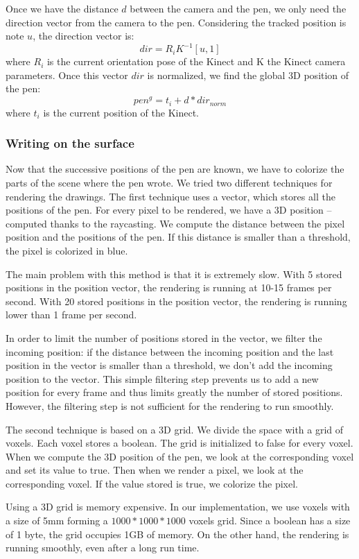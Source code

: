 \documentclass[12pt, twoside]{article}
\begin{document}
Once we have the distance $d$ between the camera and the pen, we only need the direction vector from the camera to the pen. Considering the tracked position is note $u$, the direction vector is:
$$dir = R_iK^{-1}[u,1]$$
where $R_i$ is the current orientation pose of the Kinect and K the Kinect camera parameters. Once this vector $dir$ is normalized, we find the global 3D position of the pen:
$$pen^g = t_i + d*dir_{norm}$$
where $t_i$ is the current position of the Kinect.

\subsubsection{Writing on the surface}
Now that the successive positions of the pen are known, we have to colorize the parts of the scene where the pen wrote. We tried two different techniques for rendering the drawings. The first technique uses a vector, which stores all the positions of the pen. For every pixel to be rendered, we have a 3D position -- computed thanks to the raycasting. We compute the distance between the pixel position and the positions of the pen. If this distance is smaller than a threshold, the pixel is colorized in blue.

The main problem with this method is that it is extremely slow. With 5 stored positions in the position vector, the rendering is running at 10-15 frames per second. With 20 stored positions in the position vector, the rendering is running lower than 1 frame per second.

In order to limit the number of positions stored in the vector, we filter the incoming position: if the distance between the incoming position and the last position in the vector is smaller than a threshold, we don't add the incoming position to the vector. This simple filtering step prevents us to add a new position for every frame and thus limits greatly the number of stored positions. However, the filtering step is not sufficient for the rendering to run smoothly.

The second technique is based on a 3D grid. We divide the space with a grid of voxels. Each voxel stores a boolean. The grid is initialized to false for every voxel. When we compute the 3D position of the pen, we look at the corresponding voxel and set its value to true. Then when we render a pixel, we look at the corresponding voxel. If the value stored is true, we colorize the pixel.

Using a 3D grid is memory expensive. In our implementation, we use voxels with a size of 5mm forming a $1000*1000*1000$ voxels grid. Since a boolean has a size of 1 byte, the grid occupies 1GB of memory. On the other hand, the rendering is running smoothly, even after a long run time.
\end{document}
